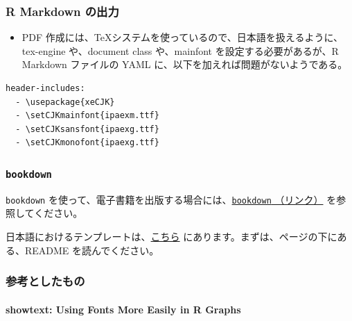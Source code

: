 \documentclass[
]{bxjsbook}
\providecommand{\tightlist}{%
  \setlength{\itemsep}{0pt}\setlength{\parskip}{0pt}}
\theoremstyle{definition}
\theoremstyle{definition}
\theoremstyle{definition}
\theoremstyle{definition}
\theoremstyle{remark}
\begin{document}
\hypertarget{r-markdown-ux306eux51faux529b}{%
\subsubsection{R Markdown の出力}\label{r-markdown-ux306eux51faux529b}}

\begin{itemize}
\tightlist
\item
  PDF 作成には、\TeX システムを使っているので、日本語を扱えるように、tex-engine や、document class や、mainfont を設定する必要があるが、R Markdown ファイルの YAML に、以下を加えれば問題がないようである。
\end{itemize}

\begin{verbatim}
header-includes:
  - \usepackage{xeCJK}
  - \setCJKmainfont{ipaexm.ttf}
  - \setCJKsansfont{ipaexg.ttf}
  - \setCJKmonofont{ipaexg.ttf}
\end{verbatim}

\hypertarget{bookdown}{%
\subsubsection{\texorpdfstring{\texttt{bookdown}}{bookdown}}\label{bookdown}}

\texttt{bookdown} を使って、電子書籍を出版する場合には、\href{https://bookdown.org/yihui/bookdown/}{\texttt{bookdown} （リンク）} を参照してください。

日本語におけるテンプレートは、\href{https://github.com/icu-hsuzuki/bs4_book_template}{こちら} にあります。まずは、ページの下にある、README を読んでください。

\hypertarget{ux53c2ux8003ux3068ux3057ux305fux3082ux306e}{%
\subsubsection{参考としたもの}\label{ux53c2ux8003ux3068ux3057ux305fux3082ux306e}}

\hypertarget{showtext-using-fonts-more-easily-in-r-graphs}{%
\paragraph{showtext: Using Fonts More Easily in R Graphs}\label{showtext-using-fonts-more-easily-in-r-graphs}}
\end{document}
